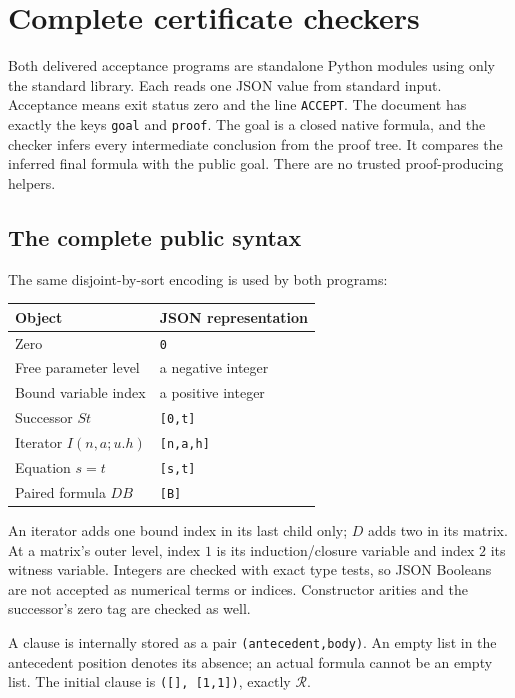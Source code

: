 \section{Complete certificate checkers}
\label{sec:implementation}

Both delivered acceptance programs are standalone Python modules using only
the standard library. Each reads one JSON value from standard input.
Acceptance means exit status zero and the line \texttt{ACCEPT}. The
document has exactly the keys \texttt{goal} and \texttt{proof}. The
goal is a closed native formula, and the checker infers every intermediate
conclusion from the proof tree. It compares the inferred final formula with
the public goal. There are no trusted proof-producing helpers.

\subsection{The complete public syntax}

The same disjoint-by-sort encoding is used by both programs:
\begin{center}
\begin{tabular}{ll}
\toprule
Object & JSON representation\\
\midrule
Zero & \texttt{0}\\
Free parameter level & a negative integer\\
Bound variable index & a positive integer\\
Successor $St$ & \texttt{[0,t]}\\
Iterator $I(n,a;u.h)$ & \texttt{[n,a,h]}\\
Equation $s=t$ & \texttt{[s,t]}\\
Paired formula $D B$ & \texttt{[B]}\\
\bottomrule
\end{tabular}
\end{center}
An iterator adds one bound index in its last child only; $D$ adds two in
its matrix. At a matrix's outer level, index $1$ is its induction/closure
variable and index $2$ its witness variable. Integers are checked with exact
type tests, so JSON Booleans are not accepted as numerical terms or indices.
Constructor arities and the successor's zero tag are checked as well.

A clause is internally stored as a pair \texttt{(antecedent,body)}.
An empty list in the antecedent position denotes its absence; an actual
formula cannot be an empty list. The initial clause is
\texttt{([], [1,1])}, exactly $\mathcal R$.

